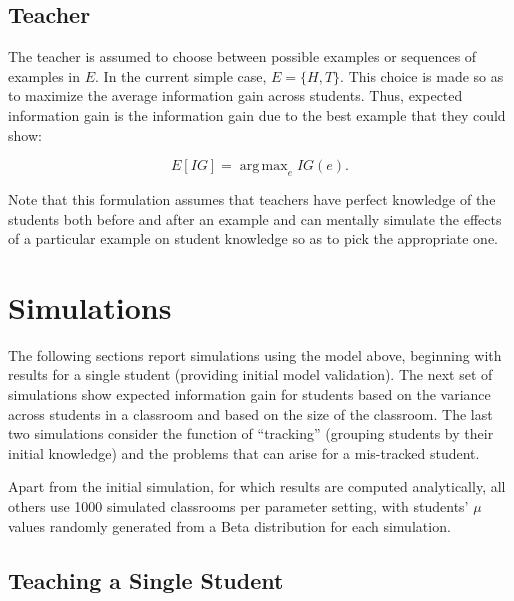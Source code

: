 \documentclass[10pt,letterpaper]{article}
\DeclareMathOperator*{\argmax}{arg\,max}
\begin{document}
\subsection{Teacher}

The teacher is assumed to choose between possible examples or sequences of examples in $E$. In the current simple case, $E=\{H,T\}$. This choice is made so as to maximize the average information gain across students. Thus, expected information gain is the information gain due to the best example that they could show:

\begin{equation}
E[IG] = \argmax_e {IG(e)}.
\end{equation}

\noindent Note that this formulation assumes that teachers have perfect knowledge of the students both before and after an example and can mentally simulate the effects of a particular example on student knowledge so as to pick the appropriate one. 

 \section{Simulations}

The following sections report simulations using the model above, beginning with results for a single student (providing initial model validation). The next set of simulations show expected information gain for students based on the variance across students in a classroom and based on the size of the classroom. The last two simulations consider the function of ``tracking'' (grouping students by their initial knowledge) and the problems that can arise for a mis-tracked student. 

Apart from the initial simulation, for which results are computed analytically, all others use 1000 simulated classrooms per parameter setting, with students' $\mu$ values randomly generated from a Beta distribution for each simulation.

\subsection{Teaching a Single Student}
\end{document}
